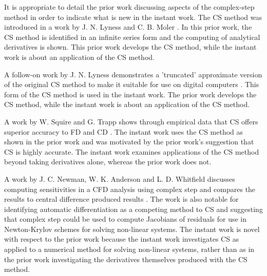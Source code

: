 \documentclass[preprint,12pt]{elsarticle}
\begin{document}
It is appropriate to detail the prior work discussing aspects of the
complex-step method in order to indicate what is new in the instant work.  The
CS method was introduced in a work by J. N. Lyness and C. B. Moler
\cite{lyness1967numerical}.  In this prior work, the CS method is identified in
an infinite series form and the computing of analytical derivatives is shown. This prior
work develops the CS method, while the instant work is about an application of
the CS method.

A follow-on work by J. N. Lyness demonstrates a 'truncated' approximate version
of the original CS method to make it suitable for use on digital computers \cite{lyness1968differentiation}.
This form of the CS method is used in the instant work.
The prior work develops the CS method, while the instant work is about an application of the CS method.

A work by W. Squire and G. Trapp shows through empirical data that CS offers superior accuracy
to FD and CD \cite{squire1998using}. The instant work uses the CS method as shown in the
prior work and was motivated by the prior work's suggestion that CS is highly accurate. 
The instant work examines applications of the CS method beyond taking derivatives alone,
whereas the prior work does not. 

A work by J. C. Newman, W. K. Anderson and L. D. Whitfield discusses computing
sensitivities in a CFD analysis using complex step and compares the results to
central difference produced results \cite{newman1998}. The work is also notable
for identifying automatic differentiation as a competing method to CS and
suggesting that complex step could be used to compute Jacobians of residuals
for use in Newton-Krylov schemes for solving non-linear systems. The instant
work is novel with respect to the prior work because the instant work
investigates CS as applied to a numerical method for solving non-linear
systems, rather than as in the prior work investigating the derivatives
themselves produced with the CS method.
\end{document}

